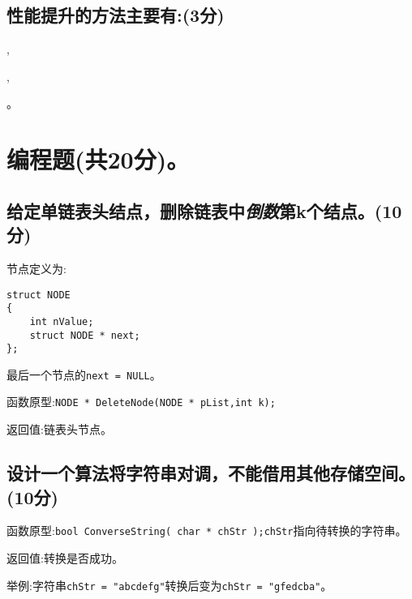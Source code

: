 ﻿\documentclass  [11pt,twocolumn]{article}
\begin{document}
\subsection{性能提升的方法主要有:(3分)}
\myblank{30em},

\myblank{30em},

\myblank{30em}。

\begin{minipage}{1\columnwidth}
\vspace{40ex}
\end{minipage}

\pagebreak
\begin{minipage}{1\columnwidth}
\section{编程题(共20分)。}

\subsection{给定单链表头结点，删除链表中\textit{倒数}第k个结点。(10分)}
节点定义为:
\begin{lstlisting}
struct NODE
{
    int nValue;
    struct NODE * next;
};
\end{lstlisting}
最后一个节点的\lstinline{next = NULL}。

函数原型:\lstinline{NODE * DeleteNode(NODE * pList,int k);}

返回值:链表头节点。
\end{minipage}

\begin{minipage}{1\columnwidth}
\vspace{70ex}
\end{minipage}

\pagebreak

\begin{minipage}{1\columnwidth}
\subsection{设计一个算法将字符串对调，不能借用其他存储空间。(10分)}
函数原型:\lstinline{bool ConverseString( char * chStr );}\lstinline{chStr}指向待转换的字符串。

返回值:转换是否成功。

举例:字符串\lstinline{chStr = "abcdefg"}转换后变为\lstinline{chStr = "gfedcba"}。
\end{minipage}
\end{document}
